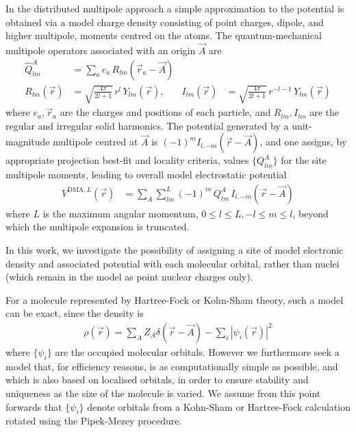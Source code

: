 \documentclass[journal=jacsat,manuscript=article]{achemso}
\begin{document}
In the distributed multipole approach\cite{Stone1981,Stone1985DistributedAnalysis,Stone2005DistributedSets.} a simple approximation to the potential is
obtained via  a model charge density consisting of point charges, dipole, and higher multipole, moments centred on the atoms.
The quantum-mechanical multipole operators associated with an origin $\vec A$ are\cite{Stone2013}
\begin{align}
    \hat Q_{lm}^A &= \sum_a e_a\, R_{lm}(\vec r_a-\vec A)
    \\
R_{lm}(\vec r)&=\sqrt{\frac{4\pi}{2l+1}}\,r^l \, Y_{lm}(\vec r)
,&
I_{lm}(\vec r)&=\sqrt{\frac{4\pi}{2l+1}}\,r^{-l-1} \, Y_{lm}(\vec r)
\end{align}
where
$e_a, \vec r_a$ are the charges and positions of each particle, and 
$R_{lm}, I_{lm}$ are the regular and irregular solid harmonics\cite{Whittaker1927, Stone2013}.
The potential generated by a unit-magnitude multipole  centred at $\vec A$ is
    $ (-1)^m I_{l,-m}(\vec r-\vec A)$,
and one assigns, by appropriate projection best-fit and locality criteria\cite{Stone1981,Stone1985DistributedAnalysis,Stone2005DistributedSets.},
values $\{Q^A_{lm}\}$ for the site multipole moments, leading to overall model electrostatic potential
\begin{align}
    V^{\text{DMA},L}(\vec r) &= \sum_A \sum_{lm}^L(-1)^m\, Q^A_{lm}\, I_{l,-m}(\vec r-\vec A)
\end{align}
where $L$ is the
maximum angular momentum, $0\le l\le L, -l\le m\le l$, beyond which the multipole expansion is truncated.

In this work, we investigate the possibility of assigning a site of model electronic density and associated potential with each molecular orbital, rather than nuclei (which remain in the model as point nuclear charges only).

For a molecule represented by Hartree-Fock or Kohn-Sham theory, such a model can be exact, since the density is
\begin{align}
    \rho(\vec r) = \sum_A Z_A \delta(\vec r - \vec A)
    -\sum_i |\psi_i(\vec r)|^2
\end{align}
where $\{\psi_i\}$ are the occupied molecular orbitals.
However we furthermore seek a model that, for efficiency reasons, is as computationally
simple as possible, and which is also based on localised orbitals, in order
to ensure stability and uniqueness as the size of the molecule is varied. We assume
from this point forwards that $\{\psi_i\}$ denote orbitals from a Kohn-Sham
or Hartree-Fock calculation rotated using the Pipek-Mezey procedure\cite{Pipek1989a}.
\end{document}
